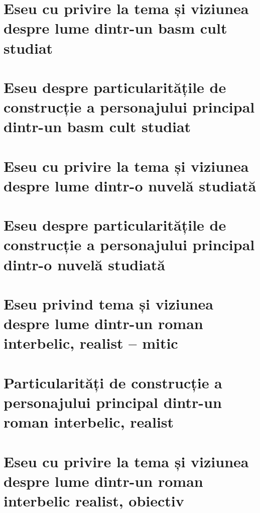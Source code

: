\documentclass[
 12pt,                       %
 a4paper                     %
]{book}
\begin{document}
\pagestyle{plain}



\chapter{Eseu cu privire la tema și viziunea despre lume dintr-un basm cult studiat}


\chapter{Eseu despre particularitățile de construcție a personajului principal dintr-un basm cult studiat}



\chapter{Eseu cu privire la tema și viziunea despre lume dintr-o nuvelă studiată}


\chapter{Eseu despre particularitățile de construcție a personajului principal dintr-o nuvelă studiată}



\chapter{Eseu privind tema și viziunea despre lume dintr-un roman interbelic, realist -- mitic}


\chapter{Particularități de construcție a personajului principal din\-tr-un roman interbelic, realist}



\chapter{Eseu cu privire la tema și viziunea despre lume dintr-un roman interbelic realist, obiectiv}

\end{document}

